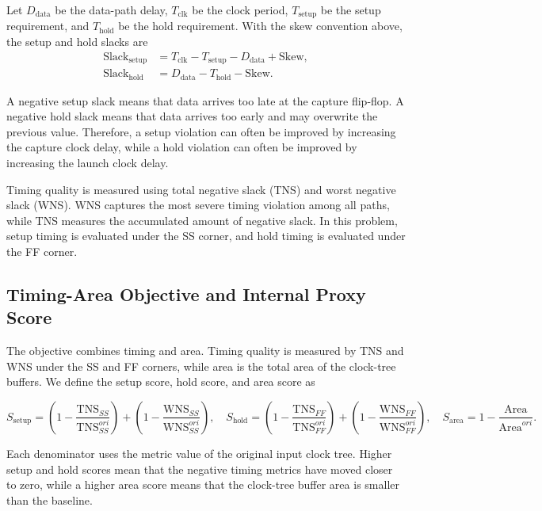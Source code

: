 \documentclass{article}
\begin{document}
Let $D_{\mathrm{data}}$ be the data-path delay, $T_{\mathrm{clk}}$ be the clock period, $T_{\mathrm{setup}}$ be the setup requirement, and $T_{\mathrm{hold}}$ be the hold requirement.  With the skew convention above, the setup and hold slacks are
\begin{align}
  \mathrm{Slack}_{\mathrm{setup}}
  &= T_{\mathrm{clk}} - T_{\mathrm{setup}} - D_{\mathrm{data}} + \mathrm{Skew}, \\
  \mathrm{Slack}_{\mathrm{hold}}
  &= D_{\mathrm{data}} - T_{\mathrm{hold}} - \mathrm{Skew}.
\end{align}

A negative setup slack means that data arrives too late at the capture flip-flop.  A negative hold slack means that data arrives too early and may overwrite the previous value.  Therefore, a setup violation can often be improved by increasing the capture clock delay, while a hold violation can often be improved by increasing the launch clock delay.

Timing quality is measured using total negative slack (TNS) and worst negative slack (WNS).  WNS captures the most severe timing violation among all paths, while TNS measures the accumulated amount of negative slack.  In this problem, setup timing is evaluated under the SS corner, and hold timing is evaluated under the FF corner.

\subsection{Timing-Area Objective and Internal Proxy Score}
The objective combines timing and area. Timing quality is measured by TNS and WNS under the SS and FF corners, while area is the total area of the clock-tree buffers.  We define the setup score, hold score, and area score as
\begin{footnotesize}
\begin{equation}
  S_{\mathrm{setup}} =
  \left( 1 - \frac{\mathrm{TNS}_{SS}}{\mathrm{TNS}_{SS}^{ori}} \right)
  +
  \left( 1 - \frac{\mathrm{WNS}_{SS}}{\mathrm{WNS}_{SS}^{ori}} \right), \quad
  S_{\mathrm{hold}} =
  \left( 1 - \frac{\mathrm{TNS}_{FF}}{\mathrm{TNS}_{FF}^{ori}} \right)
  +
  \left( 1 - \frac{\mathrm{WNS}_{FF}}{\mathrm{WNS}_{FF}^{ori}} \right), \quad
  S_{\mathrm{area}} =
  1 - \frac{\mathrm{Area}}{\mathrm{Area}^{ori}}.
  \end{equation}
\end{footnotesize}
Each denominator uses the metric value of the original input clock tree.  Higher setup and hold scores mean that the negative timing metrics have moved closer to zero, while a higher area score means that the clock-tree buffer area is smaller than the baseline.
\end{document}
